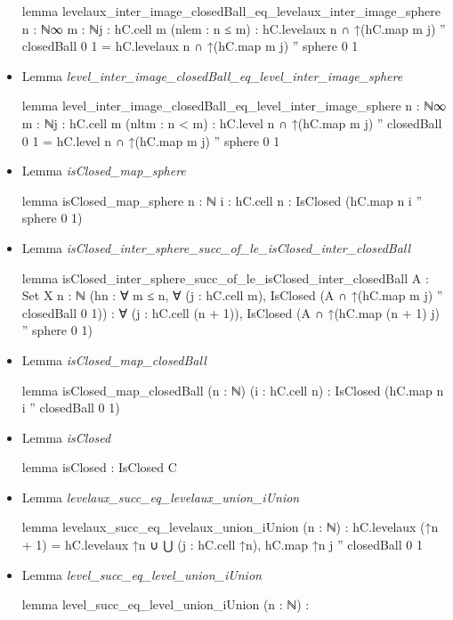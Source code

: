 \documentclass[colorinlistoftodos]{article}
\begin{document}
\begin{itemize}
\begin{leancode}
lemma levelaux_inter_image_closedBall_eq_levelaux_inter_image_sphere 
{n : ℕ∞} {m : ℕ}{j : hC.cell m} (nlem : n ≤ m) :
  hC.levelaux n ∩ ↑(hC.map m j) '' closedBall 0 1 = 
  hC.levelaux n ∩ ↑(hC.map m j) '' sphere 0 1
\end{leancode}
  \item Lemma \emph{level\_inter\_image\_closedBall\_eq\_level\_inter\_image\_sphere}
\begin{leancode}
lemma level_inter_image_closedBall_eq_level_inter_image_sphere 
{n : ℕ∞} {m : ℕ}{j : hC.cell m} (nltm : n < m) : 
  hC.level n ∩ ↑(hC.map m j) '' closedBall 0 1 = 
  hC.level n ∩ ↑(hC.map m j) '' sphere 0 1
\end{leancode}
  \item Lemma \emph{isClosed\_map\_sphere}
\begin{leancode}
lemma isClosed_map_sphere {n : ℕ} {i : hC.cell n} : IsClosed (hC.map n i '' sphere 0 1)
\end{leancode}
  \item Lemma \emph{isClosed\_inter\_sphere\_succ\_of\_le\_isClosed\_inter\_closedBall}
\begin{leancode}
lemma isClosed_inter_sphere_succ_of_le_isClosed_inter_closedBall
{A : Set X} {n : ℕ}
(hn : ∀ m ≤ n, ∀ (j : hC.cell m), IsClosed (A ∩ ↑(hC.map m j) '' closedBall 0 1)) : 
∀ (j : hC.cell (n + 1)), IsClosed (A ∩ ↑(hC.map (n + 1) j) '' sphere 0 1)
\end{leancode}
  \item Lemma \emph{isClosed\_map\_closedBall}
\begin{leancode}
lemma isClosed_map_closedBall (n : ℕ) (i : hC.cell n) : 
  IsClosed (hC.map n i '' closedBall 0 1)
\end{leancode}
  \item Lemma \emph{isClosed}
\begin{leancode}
lemma isClosed : IsClosed C
\end{leancode}
  \item Lemma \emph{levelaux\_succ\_eq\_levelaux\_union\_iUnion}
\begin{leancode}
lemma levelaux_succ_eq_levelaux_union_iUnion (n : ℕ) : 
  hC.levelaux (↑n + 1) = hC.levelaux ↑n ∪ ⋃ (j : hC.cell ↑n), hC.map ↑n j '' closedBall 0 1
\end{leancode}
  \item Lemma \emph{level\_succ\_eq\_level\_union\_iUnion}
\begin{leancode}
lemma level_succ_eq_level_union_iUnion (n : ℕ) : 

\end{leancode}
\end{itemize}
\end{document}
